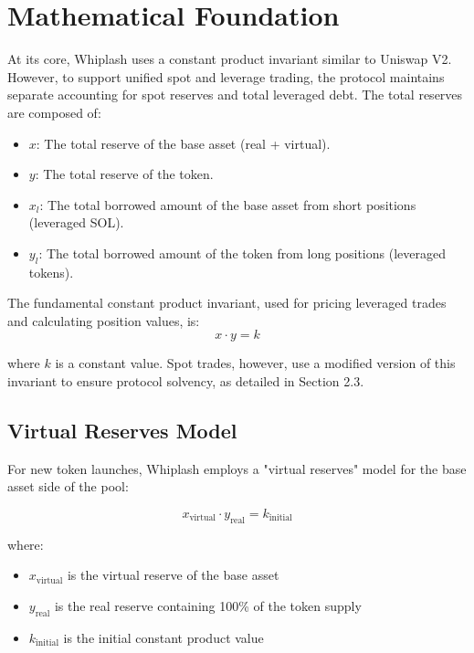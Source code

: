 \documentclass[11pt]{article}
\begin{document}
\section{Mathematical Foundation}

At its core, Whiplash uses a constant product invariant similar to Uniswap V2. However, to support unified spot and leverage trading, the protocol maintains separate accounting for spot reserves and total leveraged debt. The total reserves are composed of:
\begin{itemize}
    \item $x$: The total reserve of the base asset (real + virtual).
    \item $y$: The total reserve of the token.
    \item $x_l$: The total borrowed amount of the base asset from short positions (leveraged SOL).
    \item $y_l$: The total borrowed amount of the token from long positions (leveraged tokens).
\end{itemize}

The fundamental constant product invariant, used for pricing leveraged trades and calculating position values, is:
\begin{equation}
x \cdot y = k
\end{equation}

where $k$ is a constant value. Spot trades, however, use a modified version of this invariant to ensure protocol solvency, as detailed in Section 2.3.

\subsection{Virtual Reserves Model}

For new token launches, Whiplash employs a "virtual reserves" model for the base asset side of the pool:

\begin{equation}
x_{\text{virtual}} \cdot y_{\text{real}} = k_{\text{initial}}
\end{equation}

where:
\begin{itemize}
    \item $x_{\text{virtual}}$ is the virtual reserve of the base asset
    \item $y_{\text{real}}$ is the real reserve containing 100\% of the token supply
    \item $k_{\text{initial}}$ is the initial constant product value
\end{itemize}
\end{document}

